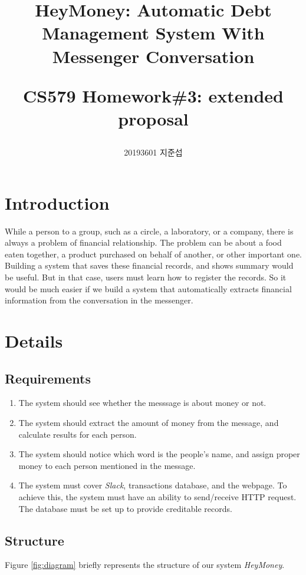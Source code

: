 \documentclass[11pt]{article}
\author{20193601 지준섭}
\title{HeyMoney: Automatic Debt Management System With Messenger Conversation \\
\begin{large}
  CS579 Homework\#3: extended proposal
\end{large}}
\begin{document}
\maketitle

\section{Introduction}

While a person to a group, such as a circle, a laboratory, or a company,
there is always a problem of financial relationship.
The problem can be about a food eaten together,
a product purchased on behalf of another, or other important one.
Building a system that saves these financial records,
and shows summary would be useful.
But in that case, users must learn how to register the records.
So it would be much easier if we build a system that
automatically extracts financial information from the conversation in the messenger.

\section{Details}

\subsection{Requirements}

\begin{enumerate}
  \item The system should see whether the messsage is about money or not.
  \item The system should extract the amount of money from the message,
    and calculate results for each person.
  \item The system should notice which word is the people's name, and assign proper money to each person mentioned in the message.
  \item The system must cover \textit{Slack}, transactions database, and the webpage.
    To achieve this, the system must have an ability to send/receive HTTP request.
    The database must be set up to provide creditable records.
\end{enumerate}

\subsection{Structure}

Figure \ref{fig:diagram} briefly represents the structure of our system \textit{HeyMoney}.
\end{document}
